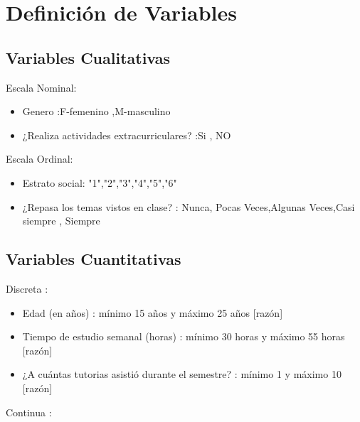 \documentclass[
  man]{apa6}
\begin{document}
\hypertarget{definiciuxf3n-de-variables}{%
\section{Definición de Variables}\label{definiciuxf3n-de-variables}}

\hypertarget{variables-cualitativas}{%
\subsection{Variables Cualitativas}\label{variables-cualitativas}}

Escala Nominal:

\begin{itemize}

  \item Genero :F-femenino ,M-masculino  
  \item ¿Realiza actividades extracurriculares? :Si , NO
  
\end{itemize}

Escala Ordinal:

\begin{itemize}

  \item Estrato social: "1","2","3","4","5","6"
  \item ¿Repasa los temas vistos en clase? : Nunca, Pocas Veces,Algunas Veces,Casi siempre , Siempre 
  
\end{itemize}

\hypertarget{variables-cuantitativas}{%
\subsection{Variables Cuantitativas}\label{variables-cuantitativas}}

Discreta :

\begin{itemize}

  \item Edad (en años) : mínimo 15 años  y máximo 25 años [razón]
  \item Tiempo de estudio semanal (horas) : mínimo 30 horas y máximo 55 horas [razón]
  \item ¿A cuántas tutorias asistió durante el semestre? : mínimo 1 y máximo 10 [razón]
  
\end{itemize}

Continua :
\end{document}
